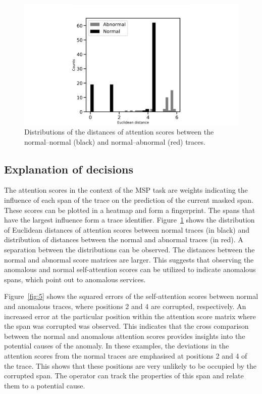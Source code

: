 \begin{figure}[!b]
\centering
\includegraphics[width=0.55\columnwidth]{gfx/chap6/euc_distance.pdf}
\caption{Distributions of the distances of attention scores between the normal--normal (black) and normal--abnormal (red) traces.}
\label{fig:4}
\end{figure}


\subsection{Explanation of decisions}
The attention scores in the context of the MSP task are weights indicating the influence of each span of the trace on the prediction of the current masked span. These scores can be plotted in a heatmap and form a fingerprint. The spans that have the largest influence form a trace identifier. Figure~\ref{fig:4} shows the distribution of Euclidean distances of attention scores between normal traces (in black) and distribution of distances between the normal and abnormal traces (in red). A separation between the distributions can be observed. The distances between the normal and abnormal score matrices are larger. This suggests that observing the anomalous and normal self-attention scores can be utilized to indicate anomalous spans, which point out to anomalous services.

Figure~\ref{fig:5} shows the squared errors of the self-attention scores between normal and anomalous traces, where positions 2 and 4 are corrupted, respectively. An increased error at the particular position within the attention score matrix where the span was corrupted was observed. This indicates that the cross comparison between the normal and anomalous attention scores provides insights into the potential causes of the anomaly. In these examples, the deviations in the attention scores from the normal traces are emphasised at positions 2 and 4 of the trace. This shows that these positions are very unlikely to be occupied by the corrupted span. The operator can track the properties of this span and relate them to a potential cause.


